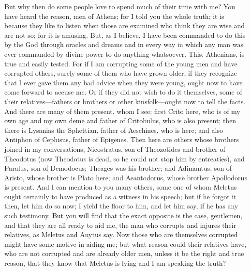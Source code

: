 \documentclass[letterpaper,12pt]{article}
\newcommand{\stephpag}[1]{\marginnote{\small\itshape\fontfamily{ppl}\selectfont #1}}
\begin{document}
But why then do some people love \stephpag{c} to spend much of their time with me? You have heard the reason, men of Athens; for I told you the whole truth; it is because they like to listen when those are examined who think they are wise and are not so; for it is amusing. But, as I believe, I have been commanded to do this by the God through oracles and dreams and in every way in which any man was ever commanded by divine power to do anything whatsoever. This, Athenians, is true and easily tested. For if I am corrupting some of the young men \stephpag{d} and have corrupted others, surely some of them who have grown older, if they recognize that I ever gave them any bad advice when they were young, ought now to have come forward to accuse me. Or if they did not wish to do it themselves, some of their relatives---fathers or brothers or other kinsfolk---ought now to tell the facts. And there are many of them present, whom I see; first Crito here, \stephpag{e} who is of my own age and my own deme and father of Critobulus, who is also present; then there is Lysanias the Sphettian, father of Aeschines, who is here; and also Antiphon of Cephisus, father of Epigenes. Then here are others whose brothers joined in my conversations, Nicostratus, son of Theozotides and brother of Theodotus (now Theodotus is dead, so he could not stop him by entreaties), and Paralus, son of Demodocus; Theages was his brother; and \stephpag{34 a} Adimantus, son of Aristo, whose brother is Plato here; and Aeantodorus, whose brother Apollodorus is present. And I can mention to you many others, some one of whom Meletus ought certainly to have produced as a witness in his speech; but if he forgot it then, let him do so now; I yield the floor to him, and let him say, if he has any such testimony. But you will find that the exact opposite is the case, gentlemen, and that they are all ready to aid me, the man who corrupts and injures their relatives, as Meletus and Anytus say. \stephpag{b} Now those who are themselves corrupted might have some motive in aiding me; but what reason could their relatives have, who are not corrupted and are already older men, unless it be the right and true reason, that they know that Meletus is lying and I am speaking the truth?
\end{document}
